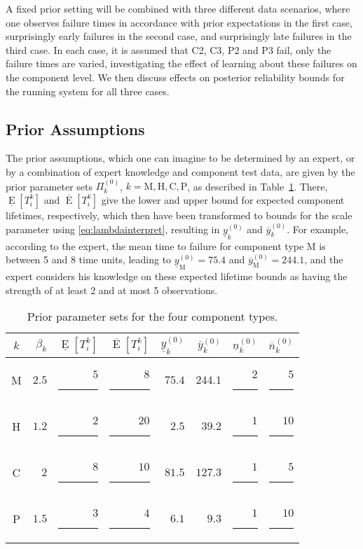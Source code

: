 \documentclass[Journal,letterpaper]{ascelike-new}
\newcommand{\uz}{^{(0)}} %
\newcommand{\ul}[1]{\underline{#1}}
\newcommand{\ol}[1]{\overline{#1}}
\newcommand{\El}{\ul{\operatorname{E}}}
\newcommand{\Eu}{\ol{\operatorname{E}}}
\def\ykzl{\ul{y}\uz_k}
\def\ykzu{\ol{y}\uz_k}
\newcommand{\ykzlfun}[1]{\ul{y}\uz_{#1}}
\newcommand{\ykzufun}[1]{\ol{y}\uz_{#1}}
\def\nkzl{\ul{n}\uz_k}
\def\nkzu{\ol{n}\uz_k}
\def\PkZ{\Pi\uz_k}
\newcommand{\PZi}[1]{\Pi\uz_{#1}}
\begin{document}
A fixed prior setting %
will be combined with three different data scenarios,
where one observes failure times in accordance with prior expectations in the first case,
surprisingly early failures in the second case, and %
surprisingly late failures in the third case. %
In each case, it is assumed that C2, C3, P2 and P3 fail, only the failure times are varied,
investigating the effect of learning about these failures on the component level.
We then discuss effects on posterior reliability bounds for the running system for all three cases.

\subsection{Prior Assumptions}
\label{sec:ex-prior}

The prior assumptions, which one can imagine to be determined by an expert,
or by a combination of expert knowledge and component test data,
are given by the prior parameter sets $\PkZ$, $k=\text{M}, \text{H}, \text{C}, \text{P}$,
as described in Table~\ref{tab:priorparamsets}.
There, $\El[T_i^k]$ and $\Eu[T_i^k]$ give the lower and upper bound for expected component lifetimes, respectively,
which then have been transformed to bounds for the scale parameter using \eqref{eq:lambdainterpret},
resulting in $\ykzl$ and $\ykzu$.
For example, according to the expert, the mean time to failure for component type M is between 5 and 8 time units,
leading to $\ykzlfun{\text{M}} = 75.4$ and $\ykzufun{\text{M}} = 244.1$,
and the expert considers his knowledge on these expected lifetime bounds
as having the strength of at least 2 and at most 5 observations.  
\begin{table}
\caption{Prior parameter sets for the four component types.}
\label{tab:priorparamsets}
\centering
\begin{tabular}{crrrrrrr}
  \toprule
$k$ & $\beta_k$ & $\El[T_i^k]$ & $\Eu[T_i^k]$ & $\ykzl$ & $\ykzu$ & $\nkzl$ & $\nkzu$ \\
  \midrule
M & $2.5$ & $5$\rule{1.5ex}{0ex} & $ 8$\rule{1.5ex}{0ex} & $75.4$ & $244.1$ & $2$\rule{1ex}{0ex} & $ 5$\rule{1ex}{0ex} \\
H & $1.2$ & $2$\rule{1.5ex}{0ex} & $20$\rule{1.5ex}{0ex} & $ 2.5$ & $ 39.2$ & $1$\rule{1ex}{0ex} & $10$\rule{1ex}{0ex} \\
C & $2  $ & $8$\rule{1.5ex}{0ex} & $10$\rule{1.5ex}{0ex} & $81.5$ & $127.3$ & $1$\rule{1ex}{0ex} & $ 5$\rule{1ex}{0ex} \\
P & $1.5$ & $3$\rule{1.5ex}{0ex} & $ 4$\rule{1.5ex}{0ex} & $ 6.1$ & $  9.3$ & $1$\rule{1ex}{0ex} & $10$\rule{1ex}{0ex} \\
  \bottomrule
\end{tabular}
\end{table}
\end{document}
